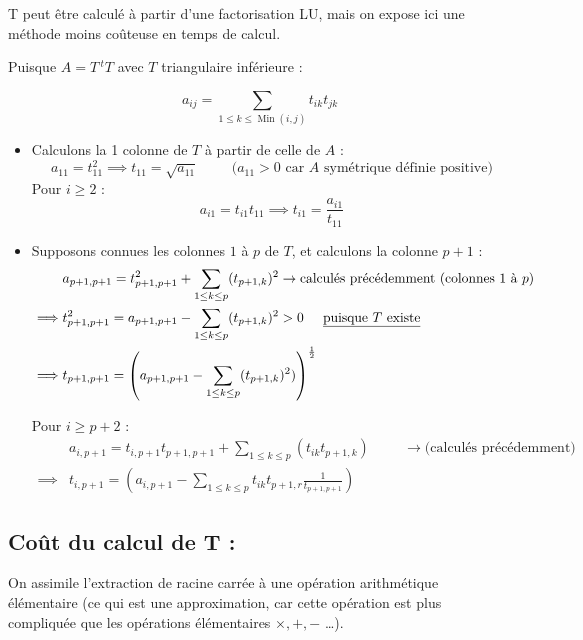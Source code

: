 \documentclass[a4paper,11pt]{article}
\newcommand{\tpo}[1]{\,^t#1}
\DeclareMathOperator{\Min}{Min}
\theoremstyle{plain} %
\begin{document}
T peut être calculé à partir d'une factorisation LU, mais on expose ici une méthode moins coûteuse en temps de calcul.

Puisque $A = T \tpo{T}$ avec $T$ triangulaire inférieure :

\[
    a_{ij} = \sum_{1 \leq k \leq \Min(i,j)} t_{ik} t_{jk}
\]

\begin{itemize}[label=$-$]
    \item Calculons la 1 colonne de $T$ à partir de celle de $A$ :
        \[
            a_{11} = t_{11}^2 \implies t_{11} = \sqrt{a_{11}} \hspace{1cm} 
            \text{($a_{11} > 0$ car $A$ symétrique définie positive)}
        \]
        Pour $i \geq 2$ :
        \[
            a_{i1} = t_{i1} t_{11} \implies t_{i1} = \frac{a_{i1}}{t_{11}}
        \]
    \item Supposons connues les colonnes $1$ à $p$ de $T$, et calculons la colonne $p+1$ :
        \begin{align*}
            & a_{p+1,p+1} = t_{p+1,p+1}^2 + \sum_{1 \leq k \leq p}(t_{p+1,k})^2 \to
            \text{calculés précédemment (colonnes 1 à $p$)} \\
            \implies & t_{p+1,p+1}^2 = a_{p+1,p+1} - \sum_{1 \leq k \leq p}(t_{p+1,k})^2 > 0 \hspace{0.5cm} \text{\underline{puisque $T$ existe}} \\
            \implies & t_{p+1,p+1} = \left(a_{p+1,p+1} - \sum_{1 \leq k \leq p}(t_{p+1,k})^2)\right)^{\frac{1}{2}}
        \end{align*}

        Pour $i \geq p+2$ :
        \begin{equation*}
            \begin{split}
                & a_{i,p+1} = t_{i,p+1} t_{p+1,p+1} + \sum_{1 \leq k \leq p}(t_{ik} t_{p+1,k})
            \hspace{1cm} \to \text{(calculés précédemment)} \\
                \implies & t_{i,p+1} = (a_{i,p+1} - \sum_{1 \leq k \leq p} t_{ik}t_{p+1,r} \frac{1}{t_{p+1,p+1}})
            \end{split}
        \end{equation*}

\end{itemize}

\subsection*{Coût du calcul de T :}
On assimile l'extraction de racine carrée à une opération arithmétique élémentaire (ce qui est
une approximation, car cette opération est plus compliquée que les opérations élémentaires
$\times, +, -$ \dots).
\end{document}
